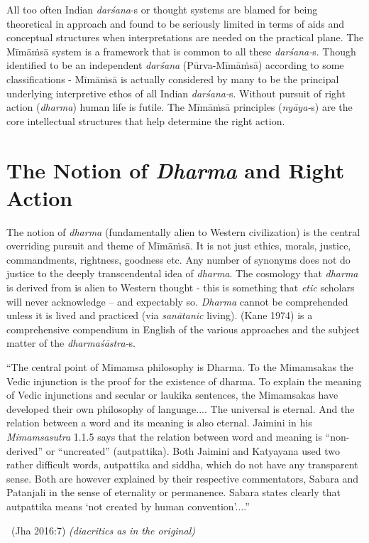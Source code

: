 All too often Indian \textit{darśana}-s or thought systems are blamed for being theoretical in approach and found to be seriously limited in terms of aids and conceptual structures when interpretations are needed on the practical plane. The Mīmāṁsā system is a framework that is common to all these \textit{darśana-}s. Though identified to be an independent \textit{darśana} (Pūrva-Mīmāṁsā) according to some classifications - Mīmāṁsā is actually considered by many to be the principal underlying interpretive ethos of all Indian \textit{darśana-}s. Without pursuit of right action (\textit{dharma}) human life is futile. The Mīmāṁsā principles (\textit{nyāya-}s) are the core intellectual structures that help determine the right action.


\section*{The Notion of \textit{Dharma} and Right Action}

The notion of \textit{dharma} (fundamentally alien to Western civilization) is the central overriding pursuit and theme of Mīmāṁsā. It is not just ethics, morals, justice, commandments, rightness, goodness etc. Any number of synonyms does not do justice to the deeply transcendental idea of \textit{dharma}. The cosmology that \textit{dharma} is derived from is alien to Western thought - this is something that \textit{etic} scholars will never acknowledge – and expectably so. \textit{Dharma} cannot be comprehended unless it is lived and practiced (via \textit{sanātanic} living). (Kane 1974) is a comprehensive compendium in English of the various approaches and the subject matter of the \textit{dharmaśāstra-}s.

\begin{myquote}
“The central point of Mimamsa philosophy is Dharma. To the Mimamsakas the Vedic injunction is the proof for the existence of dharma. To explain the meaning of Vedic injunctions and secular or laukika sentences, the Mimamsakas have developed their own philosophy of language.... The universal is eternal. And the relation between a word and its meaning is also eternal. Jaimini in his \textit{Mimamsasutra} 1.1.5 says that the relation between word and meaning is “non-derived” or “uncreated” (autpattika). Both Jaimini and Katyayana used two rather difficult words, autpattika and siddha, which do not have any transparent sense. Both are however explained by their respective commentators, Sabara and Patanjali in the sense of eternality or permanence. Sabara states clearly that autpattika means ‘not created by human convention’....”

~\hfill (Jha 2016:7) \textit{(diacritics as in the original)}
\end{myquote}

